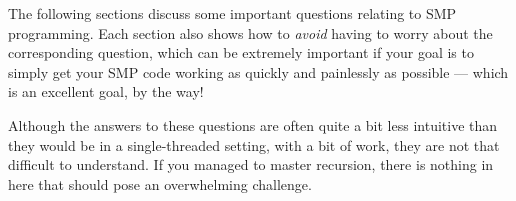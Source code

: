 

The following sections discuss some important questions relating to
SMP programming.
Each section also shows how to {\em avoid} having to worry about
the corresponding question, which can be extremely important if
your goal is to simply get your SMP code working as quickly and
painlessly as possible --- which is an excellent goal, by the way!

Although the answers to these questions are often quite a bit less
intuitive than they would be in a single-threaded setting,
with a bit of work, they are not that difficult to understand.
If you managed to master recursion, there is nothing in here that should
pose an overwhelming challenge.






